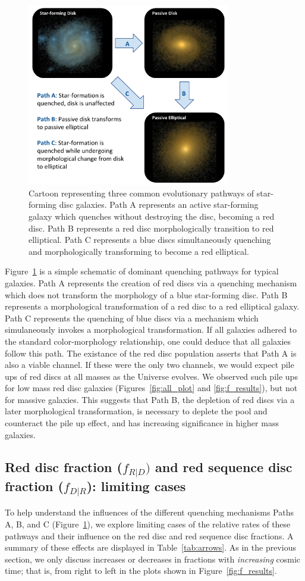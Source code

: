 \documentclass[useAMS,usenatbib]{mn2e}
\begin{document}
\begin{figure}
\centering
\includegraphics[width=3.5in]{figures/cartoon.pdf}
\caption{Cartoon representing three common evolutionary pathways of star-forming disc galaxies. Path A represents an active star-forming galaxy which quenches without destroying the disc, becoming a red disc. Path B represents a red disc morphologically transition to red elliptical. Path C represents a blue discs simultaneously quenching and morphologically transforming to become a red elliptical. }
\label{fig:cartoon}
\end{figure}

Figure~\ref{fig:cartoon} is a simple schematic of dominant quenching pathways for typical galaxies. Path A represents the creation of red discs via a quenching mechanism which does not transform the morphology of a blue star-forming disc. Path B represents a morphological transformation of a red disc to a red elliptical galaxy. Path C represents the quenching of blue discs via a mechanism which simulaneously invokes a morphological transformation. If all galaxies adhered to the standard color-morphology relationship, one could deduce that all galaxies follow this path. The existance of the red disc population asserts that Path A is also a viable channel. If these were the only two channels, we would expect pile ups of red discs at all masses as the Universe evolves. We observed such pile ups for low mass red disc galaxies (Figures~\ref{fig:all_plot} and \ref{fig:f_results}), but not for massive galaxies. This suggests that Path B, the depletion of red discs via a later morphological transformation, is necessary to deplete the pool and counteract the pile up effect, and has increasing significance in higher mass galaxies.  


\subsection{Red disc fraction ($f_{R|D})$ and red sequence disc fraction ($f_{D|R}$): limiting cases}
To help understand the influences of the different quenching mechanisms Paths A, B, and C (Figure~\ref{fig:cartoon}), we explore limiting cases of the relative rates of these pathways and their influence on the red disc and red sequence disc fractions. A summary of these effects are displayed in Table~\ref{tab:arrows}. As in the previous section, we only discuss increases or decreases in fractions with \emph{increasing} cosmic time; that is, from right to left in the plots shown in Figure~\ref{fig:f_results}.
\end{document}
